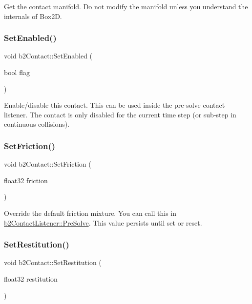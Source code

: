 Get the contact manifold. Do not modify the manifold unless you understand the internals of Box2D. \mbox{\label{classb2Contact_a6edf582f8c161d6632854cddefe55a0c}} 
\subsubsection{\texorpdfstring{Set\+Enabled()}{SetEnabled()}}
{\footnotesize\ttfamily void b2\+Contact\+::\+Set\+Enabled (\begin{DoxyParamCaption}\item[{bool}]{flag }\end{DoxyParamCaption})\hspace{0.3cm}{\ttfamily [inline]}}

Enable/disable this contact. This can be used inside the pre-\/solve contact listener. The contact is only disabled for the current time step (or sub-\/step in continuous collisions). \mbox{\label{classb2Contact_a5e8fbb6bb2966ac84272bb0ea9d2e4c7}} 
\subsubsection{\texorpdfstring{Set\+Friction()}{SetFriction()}}
{\footnotesize\ttfamily void b2\+Contact\+::\+Set\+Friction (\begin{DoxyParamCaption}\item[{float32}]{friction }\end{DoxyParamCaption})\hspace{0.3cm}{\ttfamily [inline]}}

Override the default friction mixture. You can call this in \mbox{\hyperlink{classb2ContactListener_a416f85eb45a1099053402b15a19a7de0}{b2\+Contact\+Listener\+::\+Pre\+Solve}}. This value persists until set or reset. \mbox{\label{classb2Contact_a24ca342c2bb766c53ef5ad04f5268fc1}} 
\subsubsection{\texorpdfstring{Set\+Restitution()}{SetRestitution()}}
{\footnotesize\ttfamily void b2\+Contact\+::\+Set\+Restitution (\begin{DoxyParamCaption}\item[{float32}]{restitution }\end{DoxyParamCaption})\hspace{0.3cm}{\ttfamily [inline]}}

